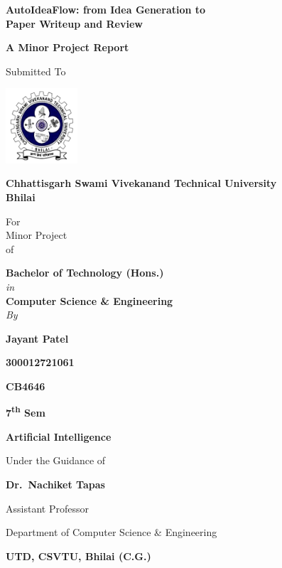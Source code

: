 \begin{titlepage}
    \centering
    
    {\Large\bfseries AutoIdeaFlow: from Idea Generation to \\ Paper Writeup and Review\par}
    \vspace{0.5cm}
    
    {\Large\textbf{A Minor Project Report}\par}
  
    {\Large Submitted To\par}
    \vspace{0.4cm}
  
    \includegraphics[width=0.2\textwidth]{images/logo.png}\par
    
    {\Large\textbf{Chhattisgarh Swami Vivekanand Technical University\\Bhilai}\par}
    
    \large For \\ Minor Project \\ of \par
    
    \textbf{Bachelor of Technology (Hons.)} \\\textit{in} \\\textbf{Computer Science \& Engineering} \\\textit{By}\par
    \vspace{0.5cm}
    
    \textbf{Jayant Patel}\par
    \textbf{300012721061}\par 
    \textbf{CB4646}\par
    \textbf{7\textsuperscript{th} Sem}\par
    \textbf{Artificial Intelligence}\par
    
    \vspace{0.5cm}
    
    Under the Guidance of\par 
    \textbf{Dr.\ Nachiket Tapas}\par
    Assistant Professor\par 
    Department of Computer Science \& Engineering\par
    \textbf{UTD, CSVTU, Bhilai (C.G.)}\par
    

\end{titlepage}
